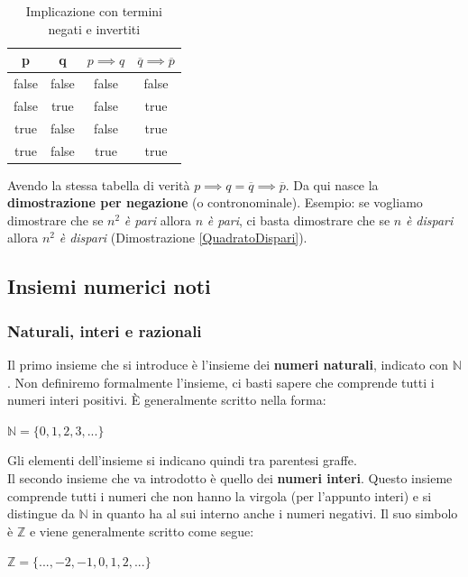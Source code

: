 \begin{table}[H]
\centering
\begin{tabular}{|cc|c|c|}
\hline
p & q & \multicolumn{1}{l|}{$p \implies q$} & \multicolumn{1}{l|}{$\overline{q} \implies \overline{p}$} \\ \hline
{\color[HTML]{000000} false} & {\color[HTML]{000000} false} & false & false \\
{\color[HTML]{000000} false} & {\color[HTML]{000000} true} & false & true \\
{\color[HTML]{000000} true} & {\color[HTML]{000000} false} & false & true \\
true & false & true & true \\ \hline
\end{tabular}
\caption{Implicazione con termini negati e invertiti}
\end{table}

Avendo la stessa tabella di verità $p \implies q = \overline{q} \implies \overline{p}$. Da qui nasce la \textbf{dimostrazione per negazione} (o contronominale). Esempio: se vogliamo dimostrare che se $n^2$ \textit{è pari} allora $n$ \textit{è pari}, ci basta dimostrare che se $n$ \textit{è dispari} allora $n^2$ \textit{è dispari} (Dimostrazione \ref{QuadratoDispari}). \label{dimostrazioneNegazione}

\subsection{Insiemi numerici noti}

\subsubsection{Naturali, interi e razionali}

Il primo insieme che si introduce è l'insieme dei \textbf{numeri naturali}, indicato con $\mathbb{N}$. Non definiremo formalmente l'insieme, ci basti sapere che comprende tutti i numeri interi positivi. È generalmente scritto nella forma:
\begin{center}
    $\mathbb{N} = \{0, 1, 2, 3, ...\}$
\end{center}
Gli elementi dell'insieme si indicano quindi tra parentesi graffe.\\

Il secondo insieme che va introdotto è quello dei \textbf{numeri interi}. Questo insieme comprende tutti i numeri che non hanno la virgola (per l'appunto interi) e si distingue da $\mathbb{N}$ in quanto ha al sui interno anche i numeri negativi. Il suo simbolo è $\mathbb{Z}$ e viene generalmente scritto come segue:
\begin{center}
    $\mathbb{Z} = \{..., -2, -1, 0, 1, 2, ...\}$
\end{center}


